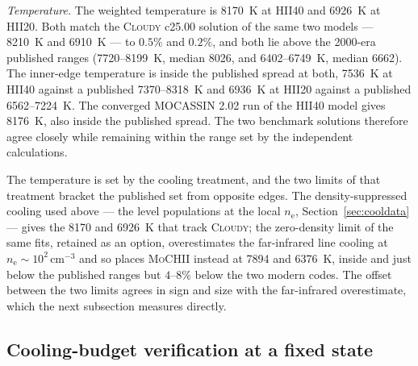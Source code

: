 \documentclass[twocolumn,linenumbers]{aastex702}
\newcommand{\MoCHII}{\textsc{MoCHII}}
\newcommand{\nelec}{n_{\mathrm{e}}}
\begin{document}
\emph{Temperature.}  The weighted temperature is 8170~K at HII40 and
6926~K at HII20.  Both match the \textsc{Cloudy} c25.00 solution of the
same two models --- 8210~K and 6910~K --- to $0.5\%$ and $0.2\%$, and both
lie above the 2000-era published ranges (7720--8199~K, median 8026, and
6402--6749~K, median 6662).  The inner-edge temperature is inside the
published spread at both, 7536~K at HII40 against a published 7370--8318~K
and 6936~K at HII20 against a published 6562--7224~K.  The converged
MOCASSIN 2.02 run of the HII40 model gives 8176~K, also inside the published
spread.  The two benchmark solutions therefore agree closely while remaining
within the range set by the independent calculations.

The temperature is set by the cooling treatment, and the two limits of that
treatment bracket the published set from opposite edges.  The
density-suppressed cooling used above --- the level populations at the local
$\nelec$, Section~\ref{sec:cooldata} --- gives the 8170 and 6926~K that
track \textsc{Cloudy}; the zero-density limit of the same fits, retained as
an option, overestimates the far-infrared line cooling at
$\nelec \sim 10^{2}\,\mathrm{cm^{-3}}$ and so places \MoCHII{} instead at
7894 and 6376~K, inside and just below the published ranges but $4$--$8\%$
below the two modern codes.  The offset between the two limits agrees in
sign and size with the far-infrared overestimate, which the next subsection
measures directly.


\subsection{Cooling-budget verification at a fixed state}
\label{sec:coolcheck}
\end{document}
